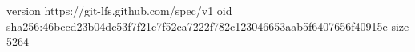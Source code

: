 version https://git-lfs.github.com/spec/v1
oid sha256:46bccd23b04dc53f7f21c7f52ca7222f782c123046653aab5f6407656f40915e
size 5264
